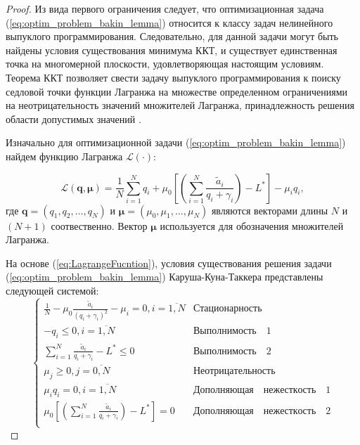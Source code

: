 \begin{proof}

Из вида первого ограничения следует, что оптимизационная задача (\ref{eq:optim_problem_bakin_lemma}) относится к классу задач нелинейного выпуклого программирования. Следовательно, для данной задачи могут быть найдены условия существования минимума ККТ, и существует единственная точка на многомерной плоскости, удовлетворяющая настоящим условиям. Теорема ККТ позволяет свести задачу выпуклого программирования к поиску седловой точки функции Лагранжа на множестве определенном ограничениями на неотрицательность значений множителей Лагранжа, принадлежность решения области допустимых значений \cite{optimizations_methods}.

Изначально для оптимизационной задачи (\ref{eq:optim_problem_bakin_lemma}) найдем функцию Лагранжа $\mathcal{L}(\cdot)$:

\begin{equation}
\mathcal{L} (\boldsymbol{q}, \boldsymbol{\mu}) = \frac{1}{N} \sum\limits_{i=1}^{N}{q_i} + \mu_0 \left[ \left(\sum\limits_{i=1}^{N} {\frac{\tilde{a}_i}{q_i + \gamma_i}}\right) - L^{*}\right] - \mu_i q_i,
\label{eq:LagrangeFucntion}
\end{equation}
где $\boldsymbol{q}=(q_1, q_2, \ldots, q_N)$ и $\boldsymbol{\mu} = (\mu_0, \mu_1, \ldots, \mu_N)$ являются векторами длины $N$ и $(N+1)$ соотвественно. Вектор $\boldsymbol{\mu}$ используется для обозначения множителей Лагранжа.

На основе (\ref{eq:LagrangeFucntion}), условия существования решения задачи (\ref{eq:optim_problem_bakin_lemma}) Каруша-Куна-Таккера представлены следующей системой:
\begin{equation}
\label{eq:KKT}
\begin{cases}
\frac{1}{N} - \mu_0 \frac{\tilde{a}_i}{(q_i + \gamma_i)^2} - \mu_i = 0, i = \overline{1,N} & \boldsymbol{\mathrm{Стационарность}}\\
-q_i \leq 0, i = \overline{1,N} & \boldsymbol{\mathrm{Выполнимость \quad 1}}\\
\sum\limits_{i=1}^{N} {\frac{\tilde{a}_i}{q_i + \gamma_i}} - L^{*} \leq 0 & \boldsymbol{\mathrm{Выполнимость \quad 2}}\\
\mu_j \geq 0, j = \overline{0,N} & \boldsymbol{\mathrm{Неотрицательность}}\\
\mu_i q_i = 0, i = \overline{1,N} & \boldsymbol{\mathrm{Дополняющая \quad нежесткость \quad 1}}\\
\mu_0 \left[ \left(\sum\limits_{i=1}^{N} {\frac{\tilde{a}_i}{q_i + \gamma_i}}\right) - L^{*}\right] = 0 & \boldsymbol{\mathrm{Дополняющая \quad нежесткость \quad 2}}\\
\end{cases}
\end{equation}


\end{proof}
